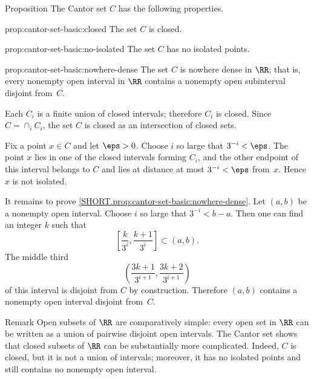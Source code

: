 \begin{thm}{Proposition}\label{prop:cantor-set-basic}
The Cantor set $C$ has the following properties.

\begin{subthm}{prop:cantor-set-basic:closed}
The set $C$ is closed.
\end{subthm}

\begin{subthm}{prop:cantor-set-basic:no-isolated}
The set $C$ has no isolated points.
\end{subthm}

\begin{subthm}{prop:cantor-set-basic:nowhere-dense}
The set $C$ is nowhere dense in $\RR$;
that is, every nonempty open interval in $\RR$ contains a nonempty open subinterval disjoint from~$C$.
\end{subthm}

\end{thm}

Each $C_i$ is a finite union of closed intervals; therefore $C_i$ is closed.
Since $C=\cap_i C_i$, the set $C$ is closed as an intersection of closed sets.

Fix a point $x\in C$ and let $\eps>0$.
Choose $i$ so large that $3^{-i}<\eps$.
The point $x$ lies in one of the closed intervals forming $C_i$, and the other endpoint of this interval belongs to $C$ and lies at distance at most $3^{-i}<\eps$ from~$x$.
Hence $x$ is not isolated.

It remains to prove \ref{SHORT.prop:cantor-set-basic:nowhere-dense}.
Let $(a,b)$ be a nonempty open interval.
Choose $i$ so large that $3^{-i}<b-a$.
Then one can find an integer $k$ such that
\[
\left[\frac{k}{3^i},\frac{k+1}{3^i}\right]\subset (a,b).
\]
The middle third
\[
\left(\frac{3k+1}{3^{i+1}},\frac{3k+2}{3^{i+1}}\right)
\]
of this interval is disjoint from $C$ by construction.
Therefore $(a,b)$ contains a nonempty open interval disjoint from~$C$.
\qeds

\begin{thm}{Remark}\label{rem:open-vs-closed-in-R}
Open subsets of\/ $\RR$ are comparatively simple:
every open set in\/ $\RR$ can be written as a union of pairwise disjoint open intervals.
The Cantor set shows that closed subsets of\/ $\RR$ can be substantially more complicated.
Indeed, $C$ is closed, but it is not a union of intervals; moreover, it has no isolated points and still contains no nonempty open interval.
\end{thm}

